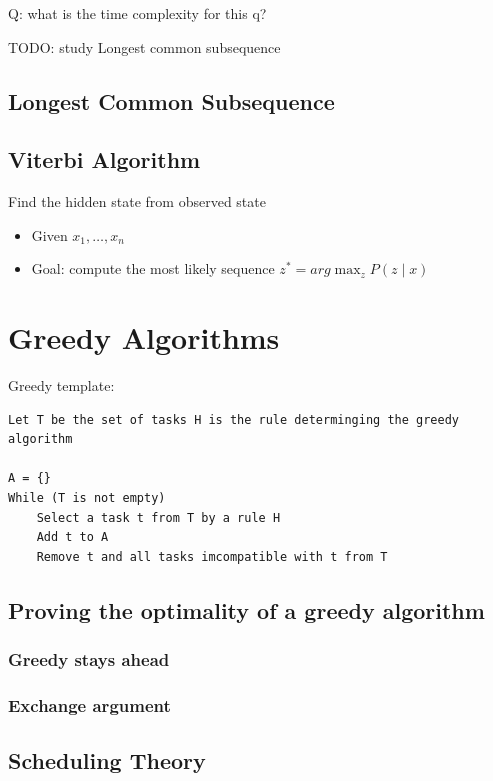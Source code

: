 \documentclass[12pt,a4paper]{article}
\begin{document}
Q: what is the time complexity for this q?

TODO: study Longest common subsequence

\subsection*{Longest Common Subsequence}

\subsection*{Viterbi Algorithm}

Find the hidden state from observed state

\begin{itemize}
    \item Given \(x_1,\dots,x_n\)
    \item Goal: compute the most likely sequence \(z^* = arg\max_z P(z\mid x)\)
\end{itemize}

\section*{Greedy Algorithms}

Greedy template:
\begin{verbatim}
Let T be the set of tasks H is the rule determinging the greedy algorithm

A = {}
While (T is not empty)
    Select a task t from T by a rule H
    Add t to A
    Remove t and all tasks imcompatible with t from T
\end{verbatim}

\subsection*{Proving the optimality of a greedy algorithm}

\subsubsection*{Greedy stays ahead}

\subsubsection*{Exchange argument}

\subsection*{Scheduling Theory}
\end{document}
